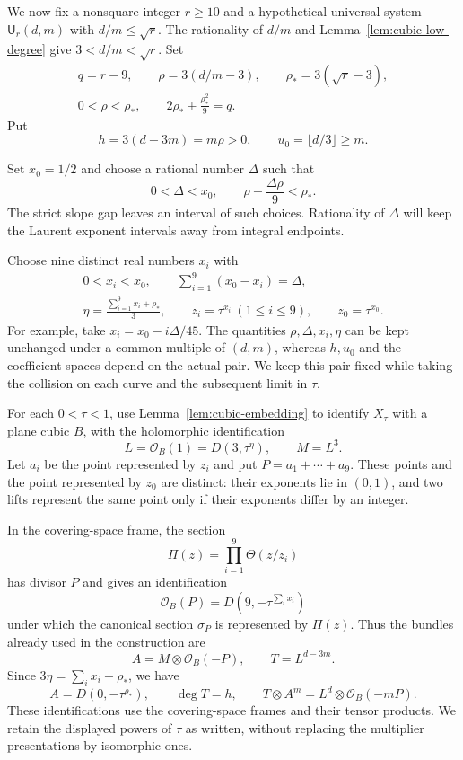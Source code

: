 We now fix a nonsquare integer $r\geq10$ and a hypothetical universal
system $\mathsf U_r(d,m)$ with $d/m\leq\sqrt r$. The rationality
of $d/m$ and Lemma~\ref{lem:cubic-low-degree} give
$3<d/m<\sqrt r$. Set
\begin{equation}
\begin{gathered}
 q=r-9,\qquad
 \rho=3(d/m-3),\qquad \rho_*=3(\sqrt r-3),\\
 0<\rho<\rho_*,\qquad
 2\rho_*+\frac{\rho_*^2}{9}=q.
\end{gathered}
\label{eq:rho}
\end{equation}
Put
\[
 h=3(d-3m)=m\rho>0,\qquad u_0=\lfloor d/3\rfloor\geq m.
\]

Set $x_0=1/2$ and choose a rational
number $\Delta$ such that
\begin{equation}
 0<\Delta<x_0,\qquad
 \rho+\frac{\Delta\rho}{9}<\rho_*.
\label{eq:delta}
\end{equation}
The strict slope gap leaves an interval of such choices.
Rationality of $\Delta$ will keep the Laurent exponent
intervals away from integral endpoints.

Choose nine distinct real numbers $x_i$ with
\begin{equation}
\begin{gathered}
 0<x_i<x_0,\qquad \sum_{i=1}^{9}(x_0-x_i)=\Delta,\\
 \eta=\frac{\sum_{i=1}^{9}x_i+\rho_*}{3},\qquad
 z_i=\tau^{x_i}\ (1\leq i\leq9),\qquad z_0=\tau^{x_0}.
\end{gathered}
\label{eq:marked-parameters}
\end{equation}
For example, take $x_i=x_0-i\Delta/45$. The quantities
$\rho,\Delta,x_i,\eta$ can be kept unchanged under a common
multiple of $(d,m)$, whereas $h,u_0$ and the coefficient spaces
depend on the actual pair. We keep this pair fixed while taking the
collision on each curve and the subsequent limit in $\tau$.

For each $0<\tau<1$, use Lemma~\ref{lem:cubic-embedding} to identify
$X_\tau$ with a plane cubic $B$, with the holomorphic identification
\[
 L=\mathcal O_B(1)=D(3,\tau^\eta),\qquad M=L^3.
\]
Let $a_i$ be the point represented by $z_i$ and put
$P=a_1+\cdots+a_9$. These points and the point represented by $z_0$
are distinct: their exponents lie in $(0,1)$, and two lifts represent
the same point only if their exponents differ by an integer.

In the covering-space frame, the section
\[
 \Pi(z)=\prod_{i=1}^{9}\Theta(z/z_i)
\]
has divisor $P$ and gives an identification
\[
 \mathcal O_B(P)=D\left(9,-\tau^{\sum_i x_i}\right)
\]
under which the canonical section $\sigma_P$ is represented by
$\Pi(z)$. Thus the bundles already used in the construction are
\[
 A=M\otimes\mathcal O_B(-P),\qquad T=L^{d-3m}.
\]
Since $3\eta=\sum_i x_i+\rho_*$, we have
\[
 A=D(0,-\tau^{\rho_*}),\qquad
 \deg T=h,\qquad
 T\otimes A^m=L^d\otimes\mathcal O_B(-mP).
\]
These identifications use the covering-space frames and their tensor
products. We retain the displayed powers of $\tau$ as written,
without replacing the multiplier presentations by isomorphic ones.

